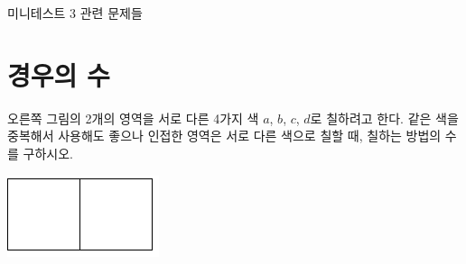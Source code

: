 \documentclass[a4paper]{oblivoir}
\begin{document}
\begin{center}
미니테스트 3 관련 문제들
\end{center}
\section{경우의 수}
%
\begin{minipage}{.65\textwidth}
\begin{Exercise}
오른쪽 그림의 2개의 영역을 서로 다른 4가지 색 \(a\), \(b\), \(c\), \(d\)로 칠하려고 한다.
같은 색을 중복해서 사용해도 좋으나 인접한 영역은 서로 다른 색으로 칠할 때, 칠하는 방법의 수를 구하시오.
\end{Exercise}
\end{minipage}
\quad
\begin{minipage}{.25\textwidth}
\includegraphics[width=.5\textwidth]{1}
\end{minipage}
\end{document}
